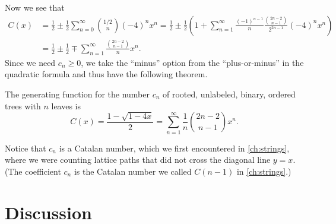 Now we see that
\begin{align*}
  C(x) &= \frac{1}{2} \pm \frac{1}{2} \sum_{n=0}^\infty\binom{1/2}{n}
  (-4)^n x^n 
  = \frac{1}{2} \pm \frac{1}{2}\left(1+ \sum_{n=1}^\infty
\frac{(-1)^{n-1}}{n}\frac{\binom{2n-2}{n-1}}{2^{2n-1}}(-4)^n
x^n\right)\\
&=
\frac{1}{2} \pm\frac{1}{2} \mp\sum_{n=1}^\infty \frac{\binom{2n-2}{n-1}}{n} x^n.
\end{align*}
Since we need $c_n\geq 0$, we take the ``minus'' option from the
``plus-or-minus'' in the quadratic formula and thus have the following
theorem.

\begin{theorem}\label{thm:catalan-genfunction}
  The generating function for the number $c_n$ of rooted, unlabeled,
  binary, ordered trees with $n$ leaves is
  \[C(x) = \frac{1-\sqrt{1-4x}}{2} = \sum_{n=1}^\infty \frac{1}{n}\binom{2n-2}{n-1}x^n.\]
\end{theorem}

Notice that $c_n$ is a Catalan number, which we first encountered in
\autoref{ch:strings}, where we were counting lattice paths that did
not cross the diagonal line $y=x$. (The coefficient $c_n$ is the
Catalan number we called $C(n-1)$ in \autoref{ch:strings}.)






\section{Discussion}\label{s:recurrence:discussion}

